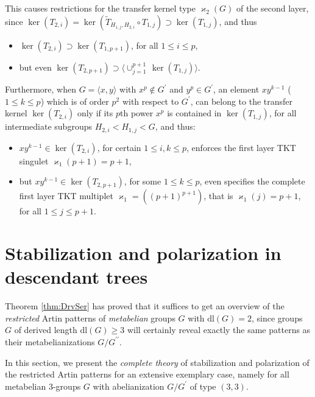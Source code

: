 \documentclass{amsart}
\theoremstyle{definition}
\numberwithin{equation}{section}
\begin{document}
\noindent
This causes restrictions for the transfer kernel type \(\varkappa_2(G)\) of the second layer,\\
since \(\ker(T_{2,i})=\ker(\tilde{T}_{H_{1,j},H_{2,i}}\circ T_{1,j})\supset\ker(T_{1,j})\), and thus

\begin{itemize}

\item
\(\ker(T_{2,i})\supset\ker(T_{1,p+1})\), for all \(1\le i\le p\),

\item
but even \(\ker(T_{2,p+1})\supset\langle\cup_{j=1}^{p+1}\,\ker(T_{1,j})\rangle\).

\end{itemize}
\noindent
Furthermore, when \(G=\langle x,y\rangle\) with \(x^p\notin G^\prime\) and \(y^p\in G^\prime\),
an element \(xy^{k-1}\) (\(1\le k\le p\)) which is of order \(p^2\) with respect to \(G^\prime\),
can belong to the transfer kernel \(\ker(T_{2,i})\)
only if its \(p\)th power \(x^p\) is contained in \(\ker(T_{1,j})\),
for all intermediate subgroups \(H_{2,i}<H_{1,j}<G\), and thus:

\begin{itemize}

\item
\(xy^{k-1}\in\ker(T_{2,i})\), for certain \(1\le i,k\le p\),
enforces the first layer TKT singulet \(\varkappa_1(p+1)=p+1\),

\item
but \(xy^{k-1}\in\ker(T_{2,p+1})\), for some \(1\le k\le p\),
even specifies the complete first layer TKT multiplet \(\varkappa_1=((p+1)^{p+1})\),
that is \(\varkappa_1(j)=p+1\), for all \(1\le j\le p+1\).

\end{itemize}



\section{Stabilization and polarization in descendant trees}
\label{s:StbAndPol}

Theorem
\ref{thm:DrvSer}
has proved that it suffices to get an overview of the \textit{restricted} Artin patterns
of \textit{metabelian} groups \(G\) with \(\mathrm{dl}(G)=2\),
since groups \(G\) of derived length \(\mathrm{dl}(G)\ge 3\) will certainly reveal
exactly the same patterns as their metabelianizations \(G/G^{\prime\prime}\).

In this section, we present the \textit{complete theory}
of stabilization and polarization of the restricted Artin patterns
for an extensive exemplary case, namely
for all metabelian \(3\)-groups \(G\) with abelianization \(G/G^\prime\) of type \((3,3)\).
\end{document}
